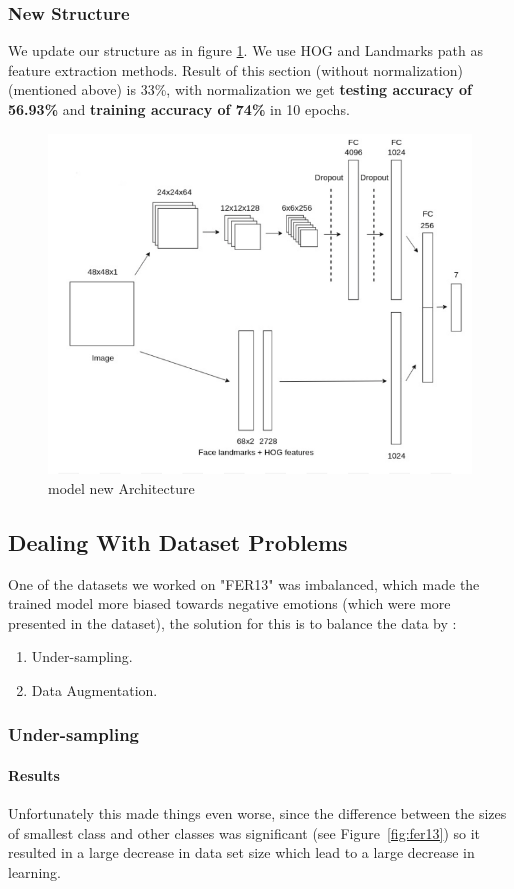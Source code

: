 \subsubsection{New Structure}
We update our structure as in figure \ref{arch}. 
We use HOG and Landmarks path as feature extraction methods.\newline
Result of this section (without normalization) (mentioned above) is 33\%,
with normalization we get \textbf{testing accuracy of 56.93\%} and \textbf{training accuracy of 74\%} in 10 epochs. 

\begin{figure}
	\centering
	\includegraphics[width=.5\textwidth]{images/Arch.png}
	\caption{model new Architecture}
	\label{arch}
\end{figure}

\subsection{Dealing With Dataset Problems}
One of the datasets we worked on "FER13" was imbalanced, which made the trained model more biased towards negative emotions (which were more presented in the dataset), the solution for this is to balance the data by :
\begin{enumerate}
	\item Under-sampling.
	\item Data Augmentation.
\end{enumerate}
\subsubsection{Under-sampling}
\paragraph{Results}
Unfortunately this made things even worse, since the difference between the sizes of smallest class and other classes was significant (see Figure~\ref{fig:fer13}) so it resulted in a large decrease in data set size which lead to a large decrease in learning.\newline

